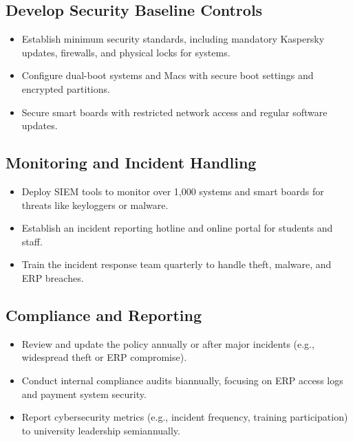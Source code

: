 \documentclass[11pt]{article}
\begin{document}
\subsection{Develop Security Baseline Controls}
\begin{itemize}
    \item Establish minimum security standards, including mandatory Kaspersky updates, firewalls, and physical locks for systems.
    \item Configure dual-boot systems and Macs with secure boot settings and encrypted partitions.
    \item Secure smart boards with restricted network access and regular software updates.
\end{itemize}

\subsection{Monitoring and Incident Handling}
\begin{itemize}
    \item Deploy SIEM tools to monitor over 1,000 systems and smart boards for threats like keyloggers or malware.
    \item Establish an incident reporting hotline and online portal for students and staff.
    \item Train the incident response team quarterly to handle theft, malware, and ERP breaches.
\end{itemize}

\subsection{Compliance and Reporting}
\begin{itemize}
    \item Review and update the policy annually or after major incidents (e.g., widespread theft or ERP compromise).
    \item Conduct internal compliance audits biannually, focusing on ERP access logs and payment system security.
    \item Report cybersecurity metrics (e.g., incident frequency, training participation) to university leadership semiannually.
\end{itemize}
\end{document}
